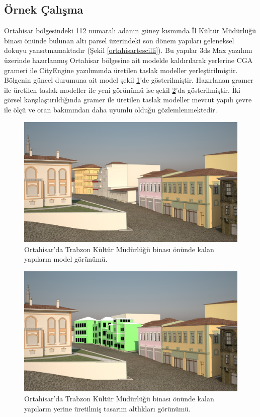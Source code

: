 \documentclass[12pt,turkish,a4paperpaper,]{report}
\begin{document}
\hypertarget{uxf6rnek-uxe7alux131ux15fma}{%
\subsection{Örnek Çalışma}\label{uxf6rnek-uxe7alux131ux15fma}}

Ortahisar bölgesindeki 112 numaralı adanın güney kısmında İl Kültür
Müdürlüğü binası önünde bulunan altı parsel üzerindeki son dönem
yapıları geleneksel dokuyu yansıtmamaktadır (Şekil
\ref{ortahisartescilli}). Bu yapılar 3ds Max yazılımı üzerinde
hazırlanmış Ortahisar bölgesine ait modelde kaldırılarak yerlerine CGA
grameri ile CityEngine yazılımında üretilen taslak modeller
yerleştirilmiştir. Bölgenin güncel durumuna ait model şekil
\ref{Eskimodel}'de gösterilmiştir. Hazırlanan gramer ile üretilen taslak
modeller ile yeni görünümü ise şekil \ref{Yenimodel}'da gösterilmiştir.
İki görsel karşılaştırıldığında gramer ile üretilen taslak modeller
mevcut yapılı çevre ile ölçü ve oran bakımından daha uyumlu olduğu
gözlemlenmektedir.

\begin{figure}
\centering
\includegraphics[width=1\textwidth,height=\textheight]{source/figures/1Original.jpg}
\caption{Ortahisar'da Trabzon Kültür Müdürlüğü binası önünde kalan
yapıların model görünümü. \label{Eskimodel}}
\end{figure}

\begin{figure}
\centering
\includegraphics[width=1\textwidth,height=\textheight]{source/figures/1Enhanced.jpg}
\caption{Ortahisar'da Trabzon Kültür Müdürlüğü binası önünde kalan
yapıların yerine üretilmiş tasarım altlıkları görünümü.
\label{Yenimodel}}
\end{figure}
\end{document}
